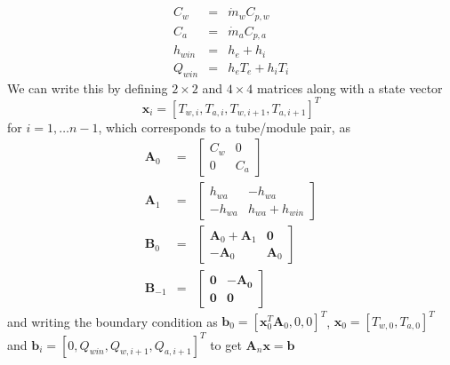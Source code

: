 \documentclass[11pt]{article}
\begin{document}
\begin{eqnarray}
C_w &=& \dot{m}_wC_{p,w} \\
C_a &=& \dot{m}_aC_{p,a} \\
h_{win} &=& h_e+h_i \\
Q_{win} &=& h_eT_e+h_iT_i
\end{eqnarray}
We can write this by defining $2\times2$ and $4\times4$ matrices along with a state vector 
\begin{equation}
\mathbf{x}_{i} = [T_{w,i}, T_{a,i},T_{w,i+1}, T_{a,i+1}]^T
\end{equation} for $i = 1,\ldots n-1$, which corresponds to a tube/module pair, as
\begin{eqnarray}
\mathbf{A}_{0} & = &\left[ \begin{array}{cc}  C_w& 0 \\ 0 & C_a\end{array}\right] \\
\mathbf{A}_{1} & = &\left[ \begin{array}{cc}  h_{wa}& - h_{wa} \\ -h_{wa} & h_{wa}+h_{win}\end{array}\right] \\
\mathbf{B}_{0} & = &\left[ \begin{array}{cc}\mathbf{A}_{0}+\mathbf{A}_1 & \mathbf{0} \\
-\mathbf{A}_{0} & \mathbf{A}_{0}\end{array}\right] \\
\mathbf{B}_{-1} & = &\left[ \begin{array}{cc} \mathbf{0} & -\mathbf{A_0} \\ \mathbf{0} & \mathbf{0}\end{array}\right]
\end{eqnarray}
and writing the boundary condition as $\mathbf{b}_0 = [\mathbf{x}_0^T\mathbf{A}_{0},0,0]^T$, $\mathbf{x}_0 = [T_{w,0},T_{a,0}]^T$ and $\mathbf{b}_{i} = [0,Q_{win},Q_{w,i+1},Q_{a,i+1}]^T$ to get $\mathbf{A}_n\mathbf{x} = \mathbf{b}$ 
\end{document}
